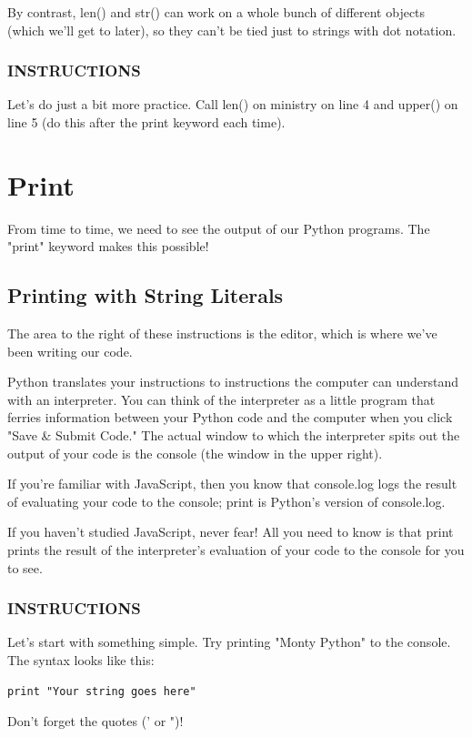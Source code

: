 \documentclass[12pt,a4paper,final,twoside,onecolumn,titlepage]{book}
\begin{document}
By contrast, len() and str() can work on a whole bunch of different objects (which we'll get to later), so they can't be tied just to strings with dot notation.

\subsubsection{INSTRUCTIONS}
Let's do just a bit more practice. Call len() on ministry on line 4 and upper() on line 5 (do this after the print keyword each time).

\section{Print}
From time to time, we need to see the output of our Python programs. The "print" keyword makes this possible!

\subsection{Printing with String Literals}
The area to the right of these instructions is the editor, which is where we've been writing our code.

Python translates your instructions to instructions the computer can understand with an interpreter. You can think of the interpreter as a little program that ferries information between your Python code and the computer when you click "Save \& Submit Code." The actual window to which the interpreter spits out the output of your code is the console (the window in the upper right).

If you're familiar with JavaScript, then you know that console.log logs the result of evaluating your code to the console; print is Python's version of console.log.

If you haven't studied JavaScript, never fear! All you need to know is that print prints the result of the interpreter's evaluation of your code to the console for you to see.

\subsubsection{INSTRUCTIONS}
Let's start with something simple. Try printing "Monty Python" to the console. The syntax looks like this:
\begin{lstlisting}
print "Your string goes here"
\end{lstlisting}
Don't forget the quotes (' or ")!
\end{document}
